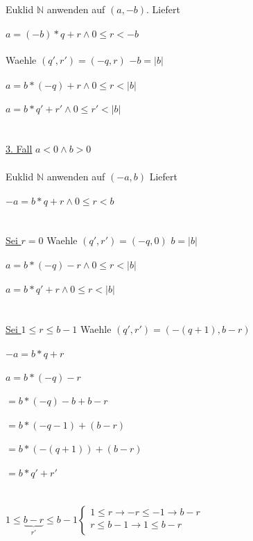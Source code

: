 \documentclass[18pt,a4paper]{article}
\begin{document}
\\
Euklid $\mathbb{N}$ anwenden auf $(a, -b)$. Liefert\\
\\
$a = (-b)*q + r \wedge 0 \leqslant r < -b$\\
\\
Waehle $(q', r') = (-q, r)$  $-b = |b|$\\
\\
$a = b*(-q) + r \wedge 0 \leqslant r < |b|$\\
\\
$a = b*q' + r' \wedge 0 \leqslant r' < |b|$\\
\\
\\
\uline{3. Fall} $a< 0 \wedge b > 0 $\\
\\
Euklid $\mathbb{N}$ anwenden auf $(-a,b)$ Liefert\\
\\
$-a = b*q + r \wedge 0 \leqslant r < b$\\
\\
\\
\uline{Sei $r=0$} Waehle $(q', r') = (-q, 0)$  $b = |b|$\\
\\
$a = b*(-q) - r \wedge 0 \leqslant r < |b|$\\
\\
$a = b*q' + r \wedge 0 \leqslant r < |b|$\\
\\
\\
\uline{Sei $1\leqslant r \leqslant b-1$} Waehle $(q', r') = (-(q+1), b-r)$\\
\\
$-a = b*q + r$\\
\\
$a = b*(-q) -r$\\
\\
$= b*(-q) -b+b -r$\\
\\
$= b*(-q-1) +(b-r)$\\
\\
$= b*(-(q+1)) +(b-r)$\\
\\
$= b*q' + r'$\\
\\
\\
$1\leqslant \underbrace{b-r}_\text{$r'$} \leqslant b-1 \begin{cases} 
                               1\leqslant r \rightarrow -r\leqslant -1 \rightarrow b-r\\
				r \leqslant b-1 \rightarrow 1 \leqslant b-r\\
                              \end{cases}$\\
\end{document}
